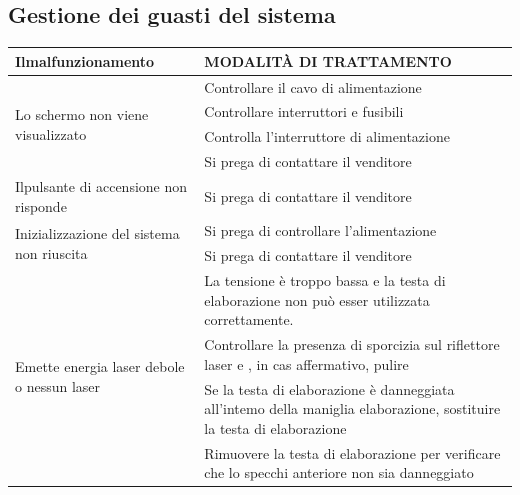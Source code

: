\documentclass[10pt]{article}
\begin{document}
\subsection{Gestione dei guasti del sistema}
\begin{center}
\begin{tabular}{|l|l|}
\hline
Ilmalfunzionamento & MODALITÀ DI TRATTAMENTO \\
\hline
\multirow{4}{*}{Lo schermo non viene visualizzato} & Controllare il cavo di alimentazione \\
\hline
 & Controllare interruttori e fusibili \\
\hline
 & Controlla l'interruttore di alimentazione \\
\hline
 & Si prega di contattare il venditore \\
\hline
Ilpulsante di accensione non risponde & Si prega di contattare il venditore \\
\hline
\multirow{2}{*}{Inizializzazione del sistema non riuscita} & Si prega di controllare l'alimentazione \\
\hline
 & Si prega di contattare il venditore \\
\hline
\multirow{4}{*}{Emette energia laser debole o nessun laser} & La tensione è troppo bassa e la testa di elaborazione non può esser utilizzata correttamente. \\
\hline
 & Controllare la presenza di sporcizia sul riflettore laser e , in cas affermativo, pulire \\
\hline
 & Se la testa di elaborazione è danneggiata all'intemo della maniglia elaborazione, sostituire la testa di elaborazione \\
\hline
 & Rimuovere la testa di elaborazione per verificare che lo specchi anteriore non sia danneggiato \\
\hline
\end{tabular}
\end{center}
\end{document}
